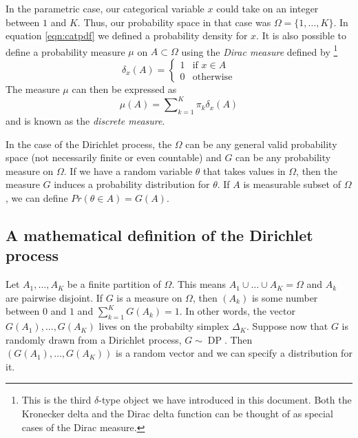 \documentclass[final,3p,times,twocolumn]{elsarticle}
\DeclareMathOperator*{\DP}{DP}
\begin{document}
In the parametric case, our categorical variable $x$ could take on an integer between $1$ and $K$.
Thus, our probability space in that case was $\Omega = \{1,\dots,K\}$.
In equation \ref{eqn:catpdf} we defined a probability density for $x$.
It is also possible to define a probability measure $\mu$ on $A \subset \Omega$ using the \emph{Dirac measure} defined by
\footnote{This is the third $\delta$-type object we have introduced in this document.
Both the Kronecker delta and the Dirac delta function can be thought of as special cases of the Dirac measure.}
\begin{equation}
\label{eqn:diracmeasure}
\delta_x(A) = \left\{ \begin{array}{lr}
1 & \mbox{if $x \in A$} \\
0 & \mbox{otherwise}
\end{array} \right.
\end{equation}
The measure $\mu$ can then be expressed as 
\begin{equation}
\label{eqn:discretemeasure}
\mu(A) = \sum\nolimits_{k=1}^K \pi_k \delta_x (A)
\end{equation}
and is known as the \emph{discrete measure}. 

In the case of the Dirichlet process, the $\Omega$ can be any general valid probability space (not necessarily finite or even countable) and $G$ can be any probability measure on $\Omega$.
If we have a random variable $\theta$ that takes values in $\Omega$, then the measure $G$ induces a probability distribution for $\theta$.
If $A$ is measurable subset of $\Omega$, we can define $Pr(\theta \in A) = G(A)$.

\subsection{A mathematical definition of the Dirichlet process}
Let $A_1,\dots,A_K$ be a finite partition of $\Omega$.
This means $A_1 \cup \dots \cup A_K = \Omega$ and $A_k$ are pairwise disjoint.
If $G$ is a measure on $\Omega$, then $(A_k)$ is some number between $0$ and $1$ and $\sum_{k=1}^K G(A_k) = 1$.
In other words, the vector $G(A_1),\dots,G(A_K)$ lives on the probabilty simplex $\Delta_K$.
Suppose now that $G$ is randomly drawn from a Dirichlet process, $G \sim \DP$.
Then $(G(A_1),\dots,G(A_K))$ is a random vector and we can specify a distribution for it.
\end{document}
